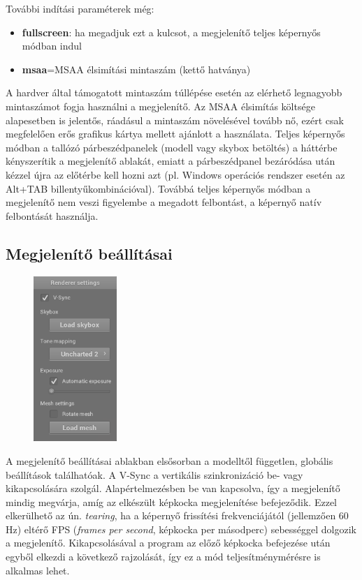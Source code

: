 További indítási paraméterek még:

\begin{itemize}[noitemsep]
\item \textbf{fullscreen}: ha megadjuk ezt a kulcsot, a megjelenítő teljes képernyős módban indul
\item \textbf{msaa}=MSAA élsimítási mintaszám (kettő hatványa)
\end{itemize}

A hardver által támogatott mintaszám túllépése esetén az elérhető legnagyobb mintaszámot fogja használni a megjelenítő. Az MSAA élsimítás költsége alapesetben is jelentős, ráadásul a mintaszám növelésével tovább nő, ezért csak megfelelően erős grafikus kártya mellett ajánlott a használata. Teljes képernyős módban a tallózó párbeszédpanelek (modell vagy skybox betöltés) a háttérbe kényszerítik a megjelenítő ablakát, emiatt a párbeszédpanel bezáródása után kézzel újra az előtérbe kell hozni azt (pl. Windows operációs rendszer esetén az Alt+TAB billentyűkombinációval). Továbbá teljes képernyős módban a megjelenítő nem veszi figyelembe a megadott felbontást, a képernyő natív felbontását használja.

\clearpage

\subsection{Megjelenítő beállításai}

\begin{figure}
    \vspace{-23pt}
    \includegraphics[width=0.28\textwidth]{images/renderer_settings.png}
    \vspace{-20pt}
\end{figure}

A megjelenítő beállításai ablakban elsősorban a modelltől független, globális beállítások találhatóak. A V-Sync a vertikális szinkronizáció be- vagy kikapcsolására szolgál. Alapértelmezésben be van kapcsolva, így a megjelenítő mindig megvárja, amíg az elkészült képkocka megjelenítése befejeződik. Ezzel elkerülhető az ún. \textit{tearing}, ha a képernyő frissítési frekvenciájától (jellemzően 60 Hz) eltérő FPS (\textit{frames per second}, képkocka per másodperc) sebességgel dolgozik a megjelenítő. Kikapcsolásával a program az előző képkocka befejezése után egyből elkezdi a következő rajzolását, így ez a mód teljesítménymérésre is alkalmas lehet.

